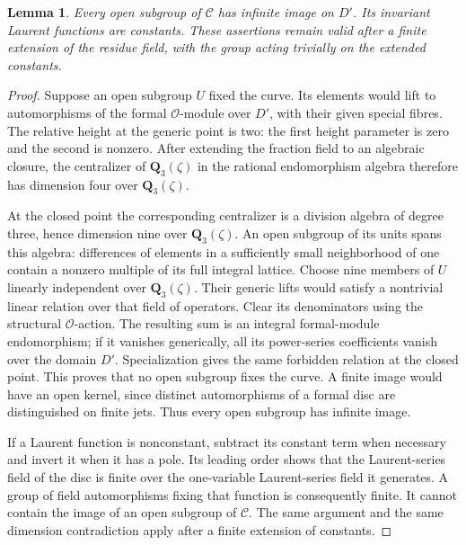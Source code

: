 \documentclass[11pt]{article}
\newtheorem{lemma}[theorem]{Lemma}
\theoremstyle{definition}
\theoremstyle{remark}
\numberwithin{equation}{section}
\begin{document}
\begin{lemma}\label{coef:infinite-action}
Every open subgroup of \(\mathcal C\) has infinite image on \(D'\).
Its invariant Laurent functions are constants.  These assertions
remain valid after a finite extension of the residue field, with
the group acting trivially on the extended constants.
\end{lemma}

\begin{proof}
Suppose an open subgroup \(U\) fixed the curve.
Its elements would lift to automorphisms of the formal
\(\mathcal O\)-module over \(D'\), with their given special fibres.
The relative height at the generic point is two:
the first height parameter is zero and the second is nonzero.
After extending the fraction field to an algebraic closure, the
centralizer of \(\mathbf Q_3(\zeta)\) in the rational endomorphism algebra
therefore has dimension four over \(\mathbf Q_3(\zeta)\).

At the closed point the corresponding centralizer is a division
algebra of degree three, hence dimension nine over \(\mathbf Q_3(\zeta)\).
An open subgroup of its units spans this algebra: differences of
elements in a sufficiently small neighborhood of one contain a
nonzero multiple of its full integral lattice.
Choose nine members of \(U\) linearly independent over
\(\mathbf Q_3(\zeta)\).
Their generic lifts would satisfy a nontrivial linear relation
over that field of operators.  Clear its denominators using the
structural \(\mathcal O\)-action.  The resulting sum is an integral
formal-module endomorphism; if it vanishes generically, all its
power-series coefficients vanish over the domain \(D'\).
Specialization gives the same forbidden relation at the closed
point.  This proves that no open subgroup fixes the curve.
A finite image would have an open kernel, since distinct
automorphisms of a formal disc are distinguished on finite jets.
Thus every open subgroup has infinite image.

If a Laurent function is nonconstant, subtract its constant term
when necessary and invert it when it has a pole.  Its leading order
shows that the Laurent-series field of the disc is finite over the
one-variable Laurent-series field it generates.  A group of field
automorphisms fixing that function is consequently finite.
It cannot contain the image of an open subgroup of \(\mathcal C\).
The same argument and the same dimension contradiction apply after
a finite extension of constants.
\end{proof}
\end{document}
